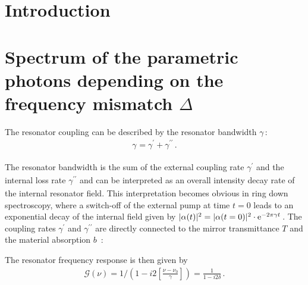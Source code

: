 \documentclass[aps,pra,showpacs,reprint,onecolumn,notitlepage]{revtex4-1}
\newcommand{\tx}[1]{\textnormal{#1}}
\begin{document}
\maketitle 

\tableofcontents

\section{Introduction}
%
%
%

\section{Spectrum of the parametric photons depending on the frequency mismatch $\Delta$}
The resonator coupling can be described by the resonator bandwidth $\gamma\,$:
\begin{align}
	\gamma_\textrm{} = \gamma^{\prime}_\textrm{} + \gamma^{\prime\prime}_\textrm{} \, .
	\label{eq:resbandwidth}
\end{align}

The resonator bandwidth is the sum of the external coupling rate $\gamma^{\prime}_\textrm{}$ and the internal loss rate $\gamma^{\prime\prime}_\textrm{}$ and can be interpreted as an overall intensity decay rate of the internal resonator field. This interpretation becomes obvious in ring down spectroscopy, where a switch-off of the external pump at time $t=0$ leads to an exponential decay of the internal field given by $|\alpha(t)|^2 = |\alpha(t=0)|^2 \cdot \tx{e}^{- 2 \pi \gamma t}\,$. The coupling rates $\gamma^\prime$ and $\gamma^{\prime\prime}$ are directly connected to the mirror transmittance $T$ and the material absorption $b\,$ \cite{Bachor2004}:

The resonator frequency response is then given by
\begin{align}
	\mathcal{G} (\nu) = 1 / \left( 1 - i 2 {\left[ \frac{\nu-\nu_0}{\gamma} \right]}  \right) = \frac{1}{ {1 - i 2 \delta} } \,.
	\label{eq:cavityresponse}
\end{align}
\end{document}
